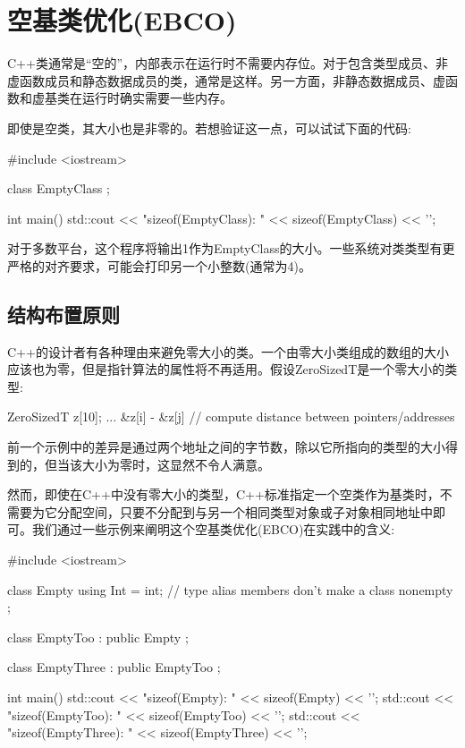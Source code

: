 \section{空基类优化(EBCO)}

C++类通常是“空的”，内部表示在运行时不需要内存位。对于包含类型成员、非虚函数成员和静态数据成员的类，通常是这样。另一方面，非静态数据成员、虚函数和虚基类在运行时确实需要一些内存。

即使是空类，其大小也是非零的。若想验证这一点，可以试试下面的代码:

\begin{cpp}
#include <iostream>

class EmptyClass {
};

int main()
{
	std::cout << "sizeof(EmptyClass): " << sizeof(EmptyClass) << ’\n’;
}
\end{cpp}

对于多数平台，这个程序将输出1作为EmptyClass的大小。一些系统对类类型有更严格的对齐要求，可能会打印另一个小整数(通常为4)。

\subsection{结构布置原则}

C++的设计者有各种理由来避免零大小的类。一个由零大小类组成的数组的大小应该也为零，但是指针算法的属性将不再适用。假设ZeroSizedT是一个零大小的类型:

\begin{cpp}
ZeroSizedT z[10];
...
&z[i] - &z[j] // compute distance between pointers/addresses
\end{cpp}

前一个示例中的差异是通过两个地址之间的字节数，除以它所指向的类型的大小得到的，但当该大小为零时，这显然不令人满意。

然而，即使在C++中没有零大小的类型，C++标准指定一个空类作为基类时，不需要为它分配空间，只要不分配到与另一个相同类型对象或子对象相同地址中即可。我们通过一些示例来阐明这个空基类优化(EBCO)在实践中的含义:

\begin{cpp}
#include <iostream>

class Empty {
	using Int = int; // type alias members don’t make a class nonempty
};

class EmptyToo : public Empty {
};

class EmptyThree : public EmptyToo {
};

int main()
{
	std::cout << "sizeof(Empty): " << sizeof(Empty) << ’\n’;
	std::cout << "sizeof(EmptyToo): " << sizeof(EmptyToo) << ’\n’;
	std::cout << "sizeof(EmptyThree): " << sizeof(EmptyThree) << ’\n’;
}
\end{cpp}

